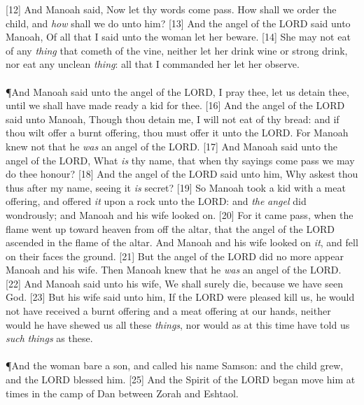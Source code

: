 [12] \textcolor[cmyk]{0.99998,1,0,0}{And Manoah said, Now let thy words come  pass. How shall we order the child, and \emph{how} shall we do unto him?}
[13] \textcolor[cmyk]{0.99998,1,0,0}{And the angel of the LORD said unto Manoah, Of all that I said unto the woman let her beware.}
[14] \textcolor[cmyk]{0.99998,1,0,0}{She may not eat of any \emph{thing} that cometh of the vine, neither let her drink wine or strong drink, nor eat any unclean \emph{thing}: all that I commanded her let her observe.}\\
\\
\P \textcolor[cmyk]{0.99998,1,0,0}{And Manoah said unto the angel of the LORD, I pray thee, let us detain thee, until we shall have made ready a kid for thee.}
[16] \textcolor[cmyk]{0.99998,1,0,0}{And the angel of the LORD said unto Manoah, Though thou detain me, I will not eat of thy bread: and if thou wilt offer a burnt offering, thou must offer it unto the LORD. For Manoah knew not that he \emph{was} an angel of the LORD.}
[17] \textcolor[cmyk]{0.99998,1,0,0}{And Manoah said unto the angel of the LORD, What \emph{is} thy name, that when thy sayings come  pass we may do thee honour?}
[18] \textcolor[cmyk]{0.99998,1,0,0}{And the angel of the LORD said unto him, Why askest thou thus after my name, seeing it \emph{is} secret?}
[19] \textcolor[cmyk]{0.99998,1,0,0}{So Manoah took a kid with a meat offering, and offered \emph{it} upon a rock unto the LORD: and \emph{the} \emph{angel} did wondrously; and Manoah and his wife looked on.}
[20] \textcolor[cmyk]{0.99998,1,0,0}{For it came  pass, when the flame went up toward heaven from off the altar, that the angel of the LORD ascended in the flame of the altar. And Manoah and his wife looked on \emph{it}, and fell on their faces  the ground.}
[21] \textcolor[cmyk]{0.99998,1,0,0}{But the angel of the LORD did no more appear  Manoah and  his wife. Then Manoah knew that he \emph{was} an angel of the LORD.}
[22] \textcolor[cmyk]{0.99998,1,0,0}{And Manoah said unto his wife, We shall surely die, because we have seen God.}
[23] \textcolor[cmyk]{0.99998,1,0,0}{But his wife said unto him, If the LORD were pleased  kill us, he would not have received a burnt offering and a meat offering at our hands, neither would he have shewed us all these \emph{things}, nor would as at this time have told us \emph{such} \emph{things} as these.}\\
\\
\P \textcolor[cmyk]{0.99998,1,0,0}{And the woman bare a son, and called his name Samson: and the child grew, and the LORD blessed him.}
[25] \textcolor[cmyk]{0.99998,1,0,0}{And the Spirit of the LORD began  move him at times in the camp of Dan between Zorah and Eshtaol.}
